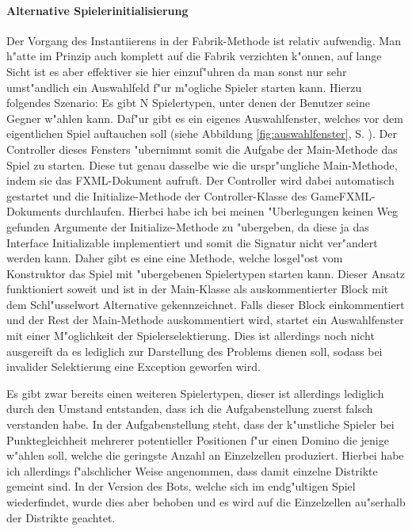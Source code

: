\paragraph{Alternative Spielerinitialisierung}
\label{par:alternativeSpielerinitialisierung}
Der Vorgang des Instantiierens in der Fabrik-Methode ist relativ aufwendig. Man h"atte im Prinzip auch komplett auf die Fabrik verzichten k"onnen, auf lange Sicht ist es aber effektiver sie hier einzuf"uhren da man sonst nur sehr umst"andlich ein Auswahlfeld f"ur m"ogliche Spieler starten kann. Hierzu folgendes Szenario: Es gibt N Spielertypen, unter denen der Benutzer seine Gegner w"ahlen kann. Daf"ur gibt es ein eigenes Auswahlfenster, welches vor dem eigentlichen Spiel auftauchen soll (siehe Abbildung \ref{fig:auswahlfenster}, S. \pageref{fig:auswahlfenster}). Der Controller dieses Fensters "ubernimmt somit die Aufgabe der Main-Methode das Spiel zu starten. Diese tut genau dasselbe wie die urspr"ungliche Main-Methode, indem sie das FXML-Dokument aufruft. Der Controller wird dabei automatisch gestartet und die Initialize-Methode der Controller-Klasse des GameFXML-Dokuments durchlaufen. Hierbei habe ich bei meinen "Uberlegungen keinen Weg gefunden Argumente der Initialize-Methode zu "ubergeben, da diese ja das Interface Initializable implementiert und somit die Signatur nicht ver"andert werden kann. Daher gibt es eine eine Methode, welche losgel"ost vom Konstruktor das Spiel mit "ubergebenen Spielertypen starten kann. Dieser Ansatz funktioniert soweit und ist in der Main-Klasse als auskommentierter Block mit dem Schl"usselwort \glqq Alternative\grqq {} gekennzeichnet. Falls dieser Block einkommentiert und der Rest der Main-Methode auskommentiert wird, startet ein Auswahlfenster mit einer M"oglichkeit der Spielerselektierung. Dies ist allerdings noch nicht ausgereift da es lediglich zur Darstellung des Problems dienen soll, sodass bei invalider Selektierung eine Exception geworfen wird. 

Es gibt zwar bereits einen weiteren Spielertypen, dieser ist allerdings lediglich durch den Umstand entstanden, dass ich die Aufgabenstellung zuerst falsch verstanden habe. In der Aufgabenstellung steht, dass der k"unstliche Spieler bei Punktegleichheit mehrerer potentieller Positionen f"ur einen Domino die jenige w"ahlen soll, welche die geringste Anzahl an Einzelzellen produziert. Hierbei habe ich allerdings f"alschlicher Weise angenommen, dass damit einzelne Distrikte gemeint sind. In der Version des Bots, welche sich im endg"ultigen Spiel wiederfindet, wurde dies aber behoben und es wird auf die Einzelzellen au"serhalb der Distrikte geachtet. 

